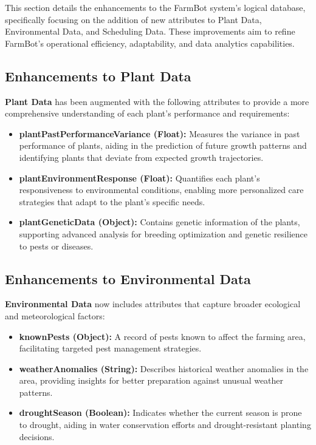 This section details the enhancements to the FarmBot system's logical database, specifically focusing on the addition of new attributes to Plant Data, Environmental Data, and Scheduling Data. These improvements aim to refine FarmBot's operational efficiency, adaptability, and data analytics capabilities.

\subsection{Enhancements to Plant Data}

\textbf{Plant Data} has been augmented with the following attributes to provide a more comprehensive understanding of each plant's performance and requirements:

\begin{itemize}
    \item \textbf{plantPastPerformanceVariance (Float):} Measures the variance in past performance of plants, aiding in the prediction of future growth patterns and identifying plants that deviate from expected growth trajectories.
    \item \textbf{plantEnvironmentResponse (Float):} Quantifies each plant's responsiveness to environmental conditions, enabling more personalized care strategies that adapt to the plant's specific needs.
    \item \textbf{plantGeneticData (Object):} Contains genetic information of the plants, supporting advanced analysis for breeding optimization and genetic resilience to pests or diseases.
\end{itemize}

\subsection{Enhancements to Environmental Data}

\textbf{Environmental Data} now includes attributes that capture broader ecological and meteorological factors:

\begin{itemize}
    \item \textbf{knownPests (Object):} A record of pests known to affect the farming area, facilitating targeted pest management strategies.
    \item \textbf{weatherAnomalies (String):} Describes historical weather anomalies in the area, providing insights for better preparation against unusual weather patterns.
    \item \textbf{droughtSeason (Boolean):} Indicates whether the current season is prone to drought, aiding in water conservation efforts and drought-resistant planting decisions.
\end{itemize}

